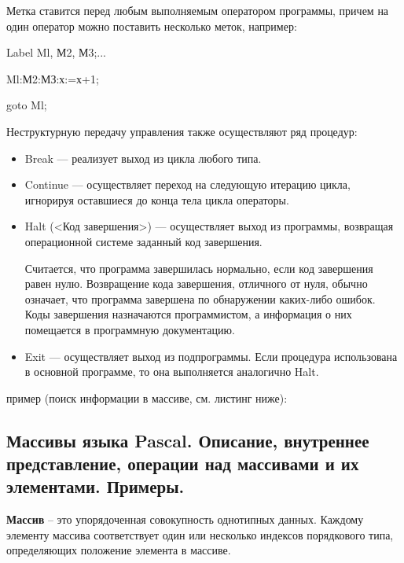 Метка ставится перед любым выполняемым оператором программы, причем на один оператор можно поставить несколько меток, например:

Label Ml, М2, М3;...

Ml:М2:МЗ:х:=х+1;

goto Ml;

Неструктурную передачу управления также осуществляют ряд процедур:
\begin{itemize}
\item Break — реализует выход из цикла любого типа.

\item Continue — осуществляет переход на следующую итерацию цикла, игнорируя оставшиеся до конца тела цикла операторы.

\item Halt (<Код завершения>) — осуществляет выход из программы, возвращая операционной системе заданный код завершения. 

Считается, что программа завершилась нормально, если код завершения равен нулю. Возвращение кода завершения, отличного от нуля, обычно означает, что программа завершена по обнаружении каких-либо ошибок. Коды завершения назначаются программистом, а информация о них помещается в программную документацию.



\item Exit — осуществляет выход из подпрограммы. Если процедура использована в основной программе, то она выполняется аналогично Halt.

\end{itemize}

пример (поиск информации в массиве, см. листинг ниже): 





\newpage\subsection{Массивы языка Pascal. Описание, внутреннее представление, операции над массивами и 
их элементами. Примеры. }

\begin{myquote}
\end{myquote}

{\bf{Массив}} – это упорядоченная совокупность однотипных данных. Каждому элементу массива соответствует один или несколько индексов порядкового типа, определяющих положение элемента в массиве.

